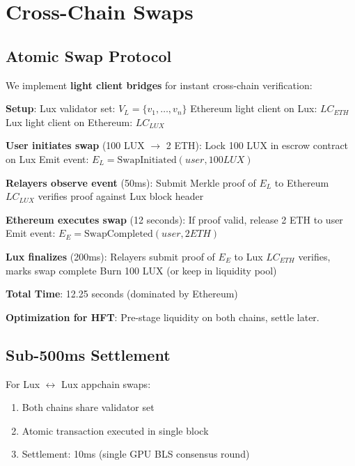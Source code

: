 \section{Cross-Chain Swaps}


\subsection{Atomic Swap Protocol}

We implement \textbf{light client bridges} for instant cross-chain verification:

\begin{algorithm}
\caption{Lux $\leftrightarrow$ Ethereum Atomic Swap}
\begin{algorithmic}
\STATE \textbf{Setup}:
\STATE Lux validator set: $V_L = \{v_1, \ldots, v_n\}$
\STATE Ethereum light client on Lux: $LC_{ETH}$
\STATE Lux light client on Ethereum: $LC_{LUX}$

\STATE \textbf{User initiates swap} (100 LUX $\to$ 2 ETH):
\STATE Lock 100 LUX in escrow contract on Lux
\STATE Emit event: $E_L = \text{SwapInitiated}(user, 100 LUX)$

\STATE \textbf{Relayers observe event} (50ms):
\STATE Submit Merkle proof of $E_L$ to Ethereum
\STATE $LC_{LUX}$ verifies proof against Lux block header

\STATE \textbf{Ethereum executes swap} (12 seconds):
\STATE If proof valid, release 2 ETH to user
\STATE Emit event: $E_E = \text{SwapCompleted}(user, 2 ETH)$

\STATE \textbf{Lux finalizes} (200ms):
\STATE Relayers submit proof of $E_E$ to Lux
\STATE $LC_{ETH}$ verifies, marks swap complete
\STATE Burn 100 LUX (or keep in liquidity pool)

\STATE \textbf{Total Time}: 12.25 seconds (dominated by Ethereum)
\end{algorithmic}
\end{algorithm}

\textbf{Optimization for HFT}: Pre-stage liquidity on both chains, settle later.

\subsection{Sub-500ms Settlement}

For Lux $\leftrightarrow$ Lux appchain swaps:

\begin{enumerate}
    \item Both chains share validator set
    \item Atomic transaction executed in single block
    \item Settlement: 10ms (single GPU BLS consensus round)
\end{enumerate}


